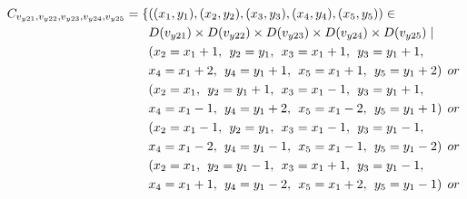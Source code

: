 \begin{equation}
\label{equ:thirdconstrain}
\begin{aligned}
\Cons{y21}{y22}{y23}{y24}{y25}=\{&((x_{1},y_{1}),(x_{2},y_{2}),(x_{3},y_{3}),(x_{4},y_{4}),(x_{5},y_{5}))\in \\
&\Domain {y21} \times \Domain{y22}\times \Domain{y23}\times \Domain{y24}\times \Domain{y25} \mid\\
&(x_{2} = x_{1} + 1,\hspace{1ex}y_{2} = y_{1},\hspace{1ex}x_{3} = x_{1}+1,\hspace{1ex}y_{3} = y_{1}+1,
\\&x_{4} = x_{1}+2,\hspace{1ex}y_{4} = y_{1}+1,\hspace{1ex}x_{5} = x_{1}+1,\hspace{1ex}y_{5} = y_{1}+2)\hspace{1ex} or \\
&(x_{2} = x_{1} ,\hspace{1ex}y_{2} = y_{1}+1,\hspace{1ex}x_{3} = x_{1}-1,\hspace{1ex}y_{3} = y_{1}+1,
\\&x_{4} = x_{1}-1,\hspace{1ex}y_{4} = y_{1}+2,\hspace{1ex}x_{5} = x_{1}-2,\hspace{1ex}y_{5} = y_{1}+1)\hspace{1ex} or \\
&(x_{2} = x_{1}-1 ,\hspace{1ex}y_{2} = y_{1},\hspace{1ex}x_{3} = x_{1}-1,\hspace{1ex}y_{3} = y_{1}-1,
\\&x_{4} = x_{1}-2,\hspace{1ex}y_{4} = y_{1}-1,\hspace{1ex}x_{5} = x_{1}-1,\hspace{1ex}y_{5} = y_{1}-2)\hspace{1ex} or \\
&(x_{2} = x_{1} ,\hspace{1ex}y_{2} = y_{1}-1,\hspace{1ex}x_{3} = x_{1}+1,\hspace{1ex}y_{3} = y_{1}-1,
\\&x_{4} = x_{1}+1,\hspace{1ex}y_{4} = y_{1}-2,\hspace{1ex}x_{5} = x_{1}+2,\hspace{1ex}y_{5} = y_{1}-1)\hspace{1ex} or \\

\end{aligned}
\end{equation}

